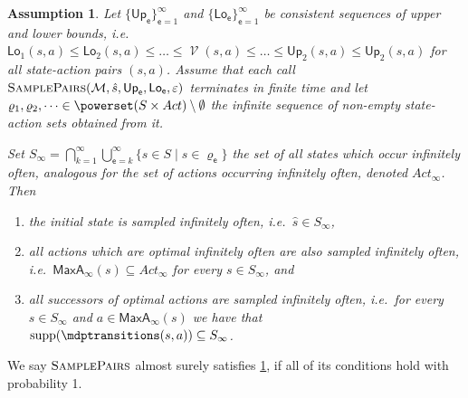\documentclass{article}
\newcommand{\UnionSym}{\bigcup}
\newcommand{\IntersectionSym}{\bigcap}
\newcommand{\Union}{\UnionSym}
\newcommand{\Intersection}{\IntersectionSym}
\newcommand{\MDP}{\mathcal{M}}
\newcommand{\States}{S}
\newcommand{\initialstate}{\hat{s}}
\newcommand{\Actions}{Act}
\newcommand{\finitepath}{\varrho}
\DeclareMathOperator{\support}{supp}
\DeclareMathOperator{\val}{\mathcal{V}}
\newcommand{\upperbound}{\mathsf{Up}}
\newcommand{\lowerbound}{\mathsf{Lo}}
\newcommand{\samplepath}{\textsc{SamplePairs}}
\newcommand{\algoepisode}{\mathsf{e}}
\newcommand{\umaxactions}{\mathsf{MaxA}}
\newtheorem{assumption}{Assumption}
\begin{document}
\begin{assumption} \label{asm:brtdp_no_ec:fair}
	Let $\{\upperbound_\algoepisode\}_{\algoepisode=1}^\infty$ and $\{\lowerbound_\algoepisode\}_{\algoepisode=1}^\infty$ be consistent sequences of upper and lower bounds, i.e.\ $\lowerbound_1(s, a) \leq \lowerbound_2(s, a) \leq \dots \leq \val(s, a) \leq \dots \leq \upperbound_2(s, a) \leq \upperbound_2(s, a)$ for all state-action pairs $(s, a)$.
	Assume that each call $\samplepath(\MDP, \initialstate, \upperbound_\algoepisode, \lowerbound_\algoepisode, \varepsilon)$ terminates in finite time and let $\finitepath_1, \finitepath_2, \dots \in \powerset(\States \times \Actions) \setminus \emptyset$ the infinite sequence of non-empty state-action sets obtained from it.

	Set $\States_\infty = {\Intersection}_{k = 1}^\infty {\Union}_{\algoepisode = k}^\infty \{s \in \States \mid s \in \finitepath_{\algoepisode}\}$ the set of all states which occur infinitely often, analogous for the set of actions occurring infinitely often, denoted $\Actions_\infty$.
	Then
	\begin{enumerate}
		\item \label{asm:brtdp_no_ec:fair:initial}
		the initial state is sampled infinitely often, i.e.\ $\initialstate \in \States_\infty$,

		\item \label{asm:brtdp_no_ec:fair:actions}
		all actions which are optimal infinitely often are also sampled infinitely often, i.e.\ $\umaxactions_\infty(s) \subseteq \Actions_\infty$ for every $s \in \States_\infty$, and

		\item \label{asm:brtdp_no_ec:fair:successors}
		all successors of optimal actions are sampled infinitely often, i.e.\ for every $s \in \States_\infty$ and $a \in \umaxactions_\infty(s)$ we have that $\support(\mdptransitions(s, a)) \subseteq \States_\infty$.
	\end{enumerate}
\end{assumption}
We say $\samplepath$ almost surely satisfies \cref{asm:brtdp_no_ec:fair}, if all of its conditions hold with probability 1.
\end{document}
